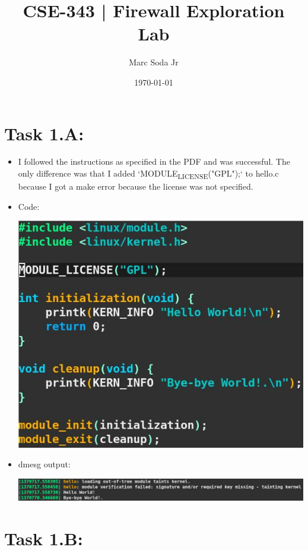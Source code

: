 \documentclass[11pt]{article}
\author{Marc Soda Jr}
\date{\today}
\title{CSE-343 | Firewall Exploration Lab}
\begin{document}
\maketitle
\tableofcontents

\section*{Task 1.A:}
\label{sec:org7c924fe}
\begin{itemize}
\item I followed the instructions as specified in the PDF and was successful. The only difference was that I added `MODULE\textsubscript{LICENSE}("GPL");` to hello.c because I got a make error because the license was not specified.
\item Code:
\begin{center}
\includegraphics[width=.9\linewidth]{./images/00.jpg}
\end{center}
\item dmesg output:
\begin{center}
\includegraphics[width=.9\linewidth]{./images/01.jpg}
\end{center}
\end{itemize}
\section*{Task 1.B:}
\label{sec:org22ae1d9}
\end{document}
